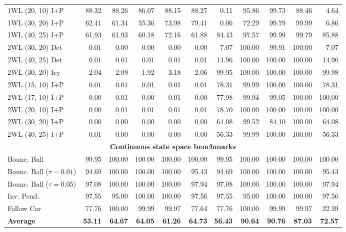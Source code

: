 {\begin{tabular}{|l|rrrrr|rrrrr|}
1WL (20, 10) I+P & 88.32 & 88.26 & 86.07 & 88.15 & 88.27 & 0.11 & 95.86 & 99.73 & 88.46 & 4.64 \\
1WL (30, 20) I+P & 62.41 & 61.34 & 55.36 & 73.98 & 79.41 & 0.06 & 72.29 & 99.79 & 99.99 & 6.86 \\
1WL (40, 25) I+P & 61.93 & 61.93 & 60.18 & 72.16 & 61.88 & 84.43 & 97.57 & 99.99 & 99.79 & 85.88 \\
\hline
2WL (30, 20) Det & 0.01 & 0.00 & 0.00 & 0.00 & 0.00 & 7.07 & 100.00 & 99.91 & 100.00 & 7.07 \\
2WL (40, 25) Det & 0.01 & 0.01 & 0.01 & 0.01 & 0.01 & 14.96 & 100.00 & 100.00 & 100.00 & 14.96 \\
\hline
2WL (30, 20) Icy & 2.04 & 2.09 & 1.92 & 3.18 & 2.06 & 99.95 & 100.00 & 100.00 & 100.00 & 99.98 \\
\hline
2WL (15, 10) I+P & 0.01 & 0.01 & 0.01 & 0.01 & 0.01 & 78.31 & 99.99 & 100.00 & 100.00 & 78.31 \\
2WL (17, 10) I+P & 0.00 & 0.01 & 0.00 & 0.01 & 0.00 & 77.98 & 99.94 & 99.05 & 100.00 & 100.00 \\
2WL (20, 10) I+P & 0.00 & 0.01 & 0.01 & 0.01 & 0.01 & 78.70 & 100.00 & 100.00 & 100.00 & 100.00 \\
2WL (30, 20) I+P & 0.00 & 0.00 & 0.00 & 0.00 & 0.00 & 64.08 & 99.52 & 84.10 & 100.00 & 64.08 \\
2WL (40, 25) I+P & 0.01 & 0.00 & 0.00 & 0.00 & 0.00 & 56.33 & 99.99 & 100.00 & 100.00 & 56.33 \\
\hline
\multicolumn{11}{|c|}{\textbf{Continuous state space benchmarks}}\\\hline
Bounc. Ball & 99.95 & 100.00 & 100.00 & 100.00 & 100.00 & 99.95 & 100.00 & 100.00 & 100.00 & 100.00 \\
Bounc. Ball ($\tau=0.01$) & 94.69 & 100.00 & 100.00 & 100.00 & 95.43 & 94.69 & 100.00 & 100.00 & 100.00 & 95.43 \\
Bounc. Ball ($\tau=0.05$) & 97.08 & 100.00 & 100.00 & 100.00 & 97.94 & 97.08 & 100.00 & 100.00 & 100.00 & 97.94 \\
\hline
Inv. Pend. & 97.55 & 95.00 & 100.00 & 100.00 & 97.56 & 97.55 & 95.00 & 100.00 & 100.00 & 97.56 \\
\hline
Follow Car & 77.76 & 100.00 & 99.99 & 99.97 & 77.64 & 77.76 & 100.00 & 99.99 & 99.97 & 22.39 \\
\hline
\textbf{Average} & \textbf{53.11} & \textbf{64.67} & \textbf{64.05} & \textbf{61.26} & \textbf{64.73} & \textbf{56.43} & \textbf{90.64} & \textbf{90.76} & \textbf{87.03} & \textbf{72.57} \\
\hline
\end{tabular}}
